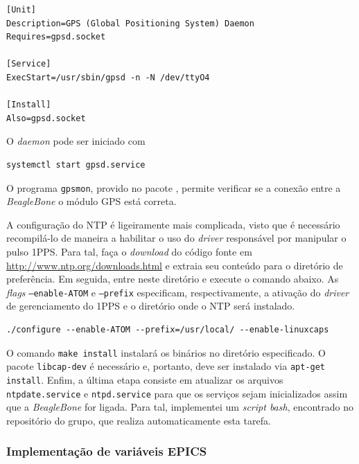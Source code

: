 \begin{lstlisting}[keywordstyle=\ttfamily, style=nonumbers]
[Unit]
Description=GPS (Global Positioning System) Daemon
Requires=gpsd.socket

[Service]
ExecStart=/usr/sbin/gpsd -n -N /dev/ttyO4

[Install]
Also=gpsd.socket
\end{lstlisting}

O \textit{daemon} pode ser iniciado com
 
\begin{lstlisting}[keywordstyle=\ttfamily, style=nonumbers]
systemctl start gpsd.service
\end{lstlisting}

O programa \texttt{gpsmon}, provido no pacote
, permite verificar se a conexão entre a \textit{BeagleBone}
o módulo GPS está correta.

\vspace{12pt}

A configuração do NTP é ligeiramente mais complicada, visto que é necessário
recompilá-lo de maneira a habilitar o uso do \textit{driver} responsável por
manipular o pulso 1PPS. Para tal, faça o \textit{download} do código fonte em
\url{http://www.ntp.org/downloads.html} e extraia seu conteúdo para o diretório
de preferência. Em seguida, entre neste diretório e execute o comando abaixo. As
\textit{flags} \texttt{--enable-ATOM} e \texttt{--prefix} especificam,
respectivamente, a ativação do \textit{driver} de gerenciamento do 1PPS e o
diretório onde o NTP será instalado.

\begin{lstlisting}[keywordstyle=\ttfamily, style=nonumbers]
./configure --enable-ATOM --prefix=/usr/local/ --enable-linuxcaps
\end{lstlisting}

\vspace{12pt}

O comando \texttt{make install} instalará os binários no diretório especificado.
O pacote \texttt{libcap-dev} é necessário e, portanto, deve ser instalado via
\texttt{apt-get install}. Enfim, a última etapa consiste em atualizar os
arquivos \texttt{ntpdate.service} e \texttt{ntpd.service} para que os serviços sejam
inicializados assim que a \textit{BeagleBone} for ligada. Para tal, implementei
um \textit{script bash}, encontrado no repositório do grupo, que
realiza automaticamente esta tarefa.

\subsubsection{Implementação de variáveis EPICS}

